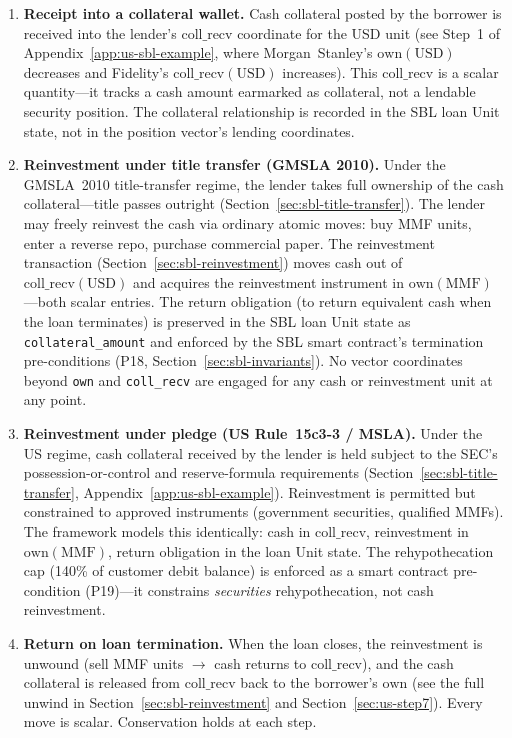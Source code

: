 \documentclass[11pt,a4paper]{article}
\begin{document}
\begin{enumerate}[nosep]
\item \textbf{Receipt into a collateral wallet.} Cash collateral posted by the borrower is received into the lender's $\mathrm{coll\_recv}$ coordinate for the USD unit (see Step~1 of Appendix~\ref{app:us-sbl-example}, where Morgan~Stanley's $\mathrm{own}(\text{USD})$ decreases and Fidelity's $\mathrm{coll\_recv}(\text{USD})$ increases). This $\mathrm{coll\_recv}$ is a scalar quantity---it tracks a cash amount earmarked as collateral, not a lendable security position. The collateral relationship is recorded in the SBL loan Unit state, not in the position vector's lending coordinates.

\item \textbf{Reinvestment under title transfer (GMSLA 2010).} Under the GMSLA~2010 title-transfer regime, the lender takes full ownership of the cash collateral---title passes outright (Section~\ref{sec:sbl-title-transfer}). The lender may freely reinvest the cash via ordinary atomic moves: buy MMF units, enter a reverse repo, purchase commercial paper. The reinvestment transaction (Section~\ref{sec:sbl-reinvestment}) moves cash out of $\mathrm{coll\_recv}(\text{USD})$ and acquires the reinvestment instrument in $\mathrm{own}(\text{MMF})$---both scalar entries. The return obligation (to return equivalent cash when the loan terminates) is preserved in the SBL loan Unit state as \texttt{collateral\_amount} and enforced by the SBL smart contract's termination pre-conditions (P18, Section~\ref{sec:sbl-invariants}). No vector coordinates beyond \texttt{own} and \texttt{coll\_recv} are engaged for any cash or reinvestment unit at any point.

\item \textbf{Reinvestment under pledge (US Rule~15c3-3 / MSLA).} Under the US regime, cash collateral received by the lender is held subject to the SEC's possession-or-control and reserve-formula requirements (Section~\ref{sec:sbl-title-transfer}, Appendix~\ref{app:us-sbl-example}). Reinvestment is permitted but constrained to approved instruments (government securities, qualified MMFs). The framework models this identically: cash in $\mathrm{coll\_recv}$, reinvestment in $\mathrm{own}(\text{MMF})$, return obligation in the loan Unit state. The rehypothecation cap (140\% of customer debit balance) is enforced as a smart contract pre-condition (P19)---it constrains \emph{securities} rehypothecation, not cash reinvestment.

\item \textbf{Return on loan termination.} When the loan closes, the reinvestment is unwound (sell MMF units $\to$ cash returns to $\mathrm{coll\_recv}$), and the cash collateral is released from $\mathrm{coll\_recv}$ back to the borrower's $\mathrm{own}$ (see the full unwind in Section~\ref{sec:sbl-reinvestment} and Section~\ref{sec:us-step7}). Every move is scalar. Conservation holds at each step.
\end{enumerate}
\end{document}
